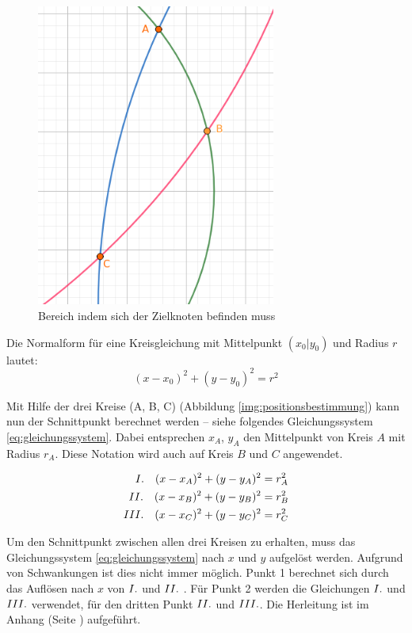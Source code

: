 \begin{figure}[H]
\centering
\includegraphics[width=0.7\textwidth]{images/positionsbestimmung_flaeche.png}
\caption{Bereich indem sich der Zielknoten befinden muss}
\label{img:schwankungen}
\end{figure}

Die Normalform für eine Kreisgleichung mit Mittelpunkt $(x_{0}|y_{0})$ und Radius $r$ lautet:
\begin{equation}
(x-x_{0})^{2}+(y-y_{0})^{2} = r^{2}
\end{equation}

Mit Hilfe der drei Kreise (A, B, C) (Abbildung \ref{img:positionsbestimmung}) kann nun der Schnittpunkt berechnet werden -- siehe folgendes Gleichungssystem \ref{eq:gleichungssystem}. Dabei entsprechen $x_{A}$, $y_{A}$ den Mittelpunkt von Kreis $A$ mit Radius $r_{A}$. Diese Notation wird auch auf Kreis $B$ und $C$ angewendet.

\begin{equation} \label{eq:gleichungssystem}
\begin{split}
\RM{1} \quad (x-x_{A})^{2}+(y-y_{A})^{2} &= r_{A}^{2} \\
\RM{2} \quad (x-x_{B})^{2}+(y-y_{B})^{2} &= r_{B}^{2} \\
\RM{3} \quad (x-x_{C})^{2}+(y-y_{C})^{2} &= r_{C}^{2}
\end{split}
\end{equation}

Um den Schnittpunkt zwischen allen drei Kreisen zu erhalten, muss das Gleichungssystem \ref{eq:gleichungssystem} nach $x$ und $y$ aufgelöst werden. Aufgrund von Schwankungen ist dies nicht immer möglich. Punkt \si{1} berechnet sich durch das Auflösen nach $x$ von $\RM{1}$ und $\RM{2}$ . Für Punkt \si{2} werden die Gleichungen $\RM{1}$ und $\RM{3}$ verwendet, für den dritten Punkt $\RM{2}$ und $\RM{3}$. Die Herleitung ist im Anhang (Seite \pageref{sec:abcdef}) aufgeführt.

